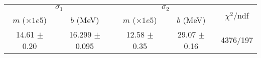 \begin{tabular}{cc|cc||c}
\multicolumn{2}{c|}{$\sigma_1$} & \multicolumn{2}{|c}{$\sigma_2$}  & \multirow{2}{*}{$\chi^2/$ndf}\\
$m$ ($\times1e5$) & $b$ (MeV) & $m$ ($\times1e5$) & $b$ (MeV)  & \\
\hline
14.61 $\pm$ 0.20 & 16.299 $\pm$ 0.095 & 12.58 $\pm$ 0.35 & 29.07 $\pm$ 0.16 & 4376/197\\
\end{tabular}
